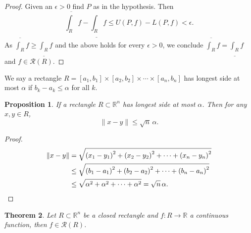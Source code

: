 \documentclass[12pt]{book}
\newcommand{\snorm}[1]{\lVert {#1} \rVert}
\newcommand{\R}{{\mathbb{R}}}
\newcommand{\sR}{{\mathcal{R}}}
\theoremstyle{plain}
\newtheorem{thm}{Theorem}[section]
\newtheorem{prop}[thm]{Proposition}
\theoremstyle{remark}
\theoremstyle{definition}
\theoremstyle{exercise}
\theoremstyle{example}
\begin{document}
\begin{proof}
Given an $\epsilon > 0$ find $P$ as in the hypothesis.  Then
\begin{equation*}
\overline{\int_R} f - 
\underline{\int_R} f 
\leq
U(P,f) - L(P,f)
< \epsilon .
\end{equation*}
As $\overline{\int_R} f \geq \underline{\int_R} f$ and the above holds for
every $\epsilon > 0$, we conclude 
$\overline{\int_R} f = \underline{\int_R} f$ and $f \in \sR(R)$.
\end{proof}

We say a rectangle $R = [a_1,b_1] \times
[a_2,b_2] \times \cdots \times
[a_n,b_n]$ has longest side at most $\alpha$ if
$b_k-a_k \leq \alpha$ for all $k$.

\begin{prop} \label{prop:diameterrectangle}
If a rectangle $R \subset \R^n$ has longest side at most $\alpha$.  Then
for any $x,y \in R$,
\begin{equation*}
\snorm{x-y} \leq \sqrt{n} \, \alpha .
\end{equation*}
\end{prop}

\begin{proof}
\begin{equation*}
\begin{split}
\snorm{x-y} 
& =
\sqrt{
{(x_1-y_1)}^2
+
{(x_2-y_2)}^2
+ \cdots +
{(x_n-y_n)}^2
}
\\
& \leq
\sqrt{
{(b_1-a_1)}^2
+
{(b_2-a_2)}^2
+ \cdots +
{(b_n-a_n)}^2
}
\\
& \leq
\sqrt{
{\alpha}^2
+
{\alpha}^2
+ \cdots +
{\alpha}^2
}
=
\sqrt{n} \, \alpha .  \qedhere
\end{split}
\end{equation*}
\end{proof}


\begin{thm} \label{mv:thm:contintrect}
Let $R \subset \R^n$ be a closed rectangle and
$f \colon R \to \R$ a continuous function,
then $f \in \sR(R)$.
\end{thm}
\end{document}
